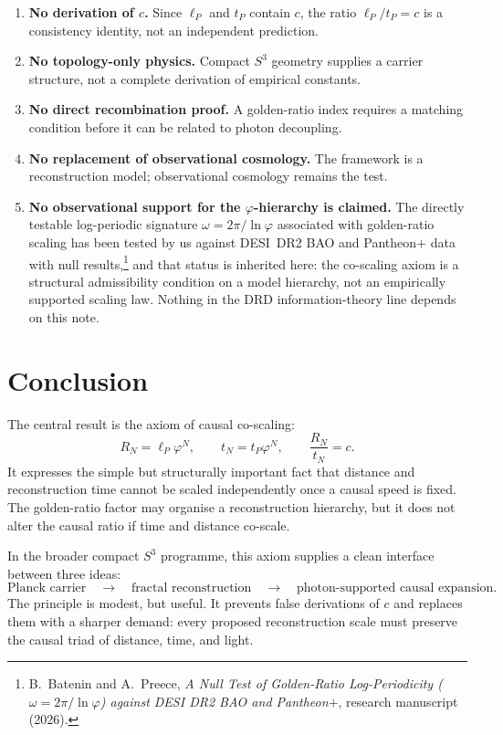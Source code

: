 \documentclass[11pt,a4paper]{article}
\newcommand{\Sthree}{S^{3}}
\newcommand{\lP}{\ell_{P}}
\newcommand{\tP}{t_{P}}
\newcommand{\ph}{\varphi}
\begin{document}
\begin{enumerate}[leftmargin=2em, itemsep=3pt]
  \item \textbf{No derivation of $c$.}  Since $\lP$ and $\tP$ contain $c$, the ratio
  $\lP/\tP=c$ is a consistency identity, not an independent prediction.
  \item \textbf{No topology-only physics.}  Compact $\Sthree$ geometry supplies a
  carrier structure, not a complete derivation of empirical constants.
  \item \textbf{No direct recombination proof.}  A golden-ratio index requires a
  matching condition before it can be related to photon decoupling.
  \item \textbf{No replacement of observational cosmology.}  The framework is a
  reconstruction model; observational cosmology remains the test.
  \item \textbf{No observational support for the $\ph$-hierarchy is claimed.}  The
  directly testable log-periodic signature $\omega=2\pi/\ln\ph$ associated with
  golden-ratio scaling has been tested by us against DESI~DR2 BAO and Pantheon$+$
  data with null results,\footnote{B.~Batenin and A.~Preece, \emph{A Null Test of
  Golden-Ratio Log-Periodicity ($\omega=2\pi/\ln\varphi$) against DESI DR2 BAO and
  Pantheon$+$}, research manuscript (2026).}  and that status is inherited here: the
  co-scaling axiom is a structural admissibility condition on a model hierarchy, not
  an empirically supported scaling law.  Nothing in the DRD information-theory line
  depends on this note.
\end{enumerate}

\section{Conclusion}

The central result is the axiom of causal co-scaling:
\[
  R_N=\lP\ph^N,\qquad
  t_N=\tP\ph^N,\qquad
  \frac{R_N}{t_N}=c.
\]
It expresses the simple but structurally important fact that distance and
reconstruction time cannot be scaled independently once a causal speed is fixed.
The golden-ratio factor may organise a reconstruction hierarchy, but it does not
alter the causal ratio if time and distance co-scale.

In the broader compact $\Sthree$ programme, this axiom supplies a clean interface
between three ideas:
\[
  \text{Planck carrier}
  \quad\longrightarrow\quad
  \text{fractal reconstruction}
  \quad\longrightarrow\quad
  \text{photon-supported causal expansion}.
\]
The principle is modest, but useful.  It prevents false derivations of $c$ and replaces
them with a sharper demand: every proposed reconstruction scale must preserve the
causal triad of distance, time, and light.
\end{document}
